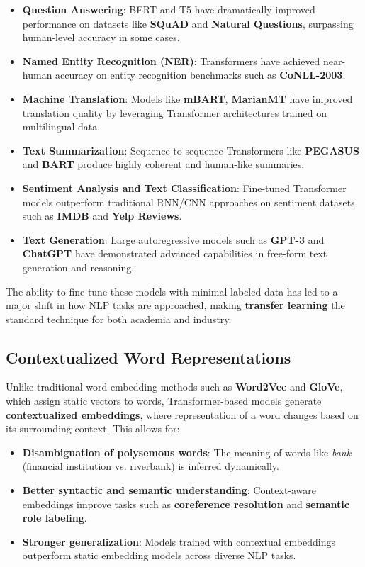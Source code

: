 \begin{itemize}
    \item \textbf{Question Answering}: BERT and T5 have dramatically improved performance on datasets like \textbf{SQuAD} and \textbf{Natural Questions}, surpassing human-level accuracy in some cases.
    \item \textbf{Named Entity Recognition (NER)}: Transformers have achieved near-human accuracy on entity recognition benchmarks such as \textbf{CoNLL-2003}.
    \item \textbf{Machine Translation}: Models like \textbf{mBART}, \textbf{MarianMT} have improved translation quality by leveraging Transformer architectures trained on multilingual data.
    \item \textbf{Text Summarization}: Sequence-to-sequence Transformers like \textbf{PEGASUS} and \textbf{BART} produce highly coherent and human-like summaries.
    \item \textbf{Sentiment Analysis and Text Classification}: Fine-tuned Transformer models outperform traditional RNN/CNN approaches on sentiment datasets such as \textbf{IMDB} and \textbf{Yelp Reviews}.
    \item \textbf{Text Generation}: Large autoregressive models such as \textbf{GPT-3} and \textbf{ChatGPT} have demonstrated advanced capabilities in free-form text generation and reasoning.
\end{itemize}

The ability to fine-tune these models with minimal labeled data has led to a major shift in how NLP tasks are approached, making \textbf{transfer learning} the standard technique for both academia and industry.

\subsection{Contextualized Word Representations}

Unlike traditional word embedding methods such as \textbf{Word2Vec} and \textbf{GloVe}, which assign static vectors to words, Transformer-based models generate \textbf{contextualized embeddings}, where representation of a word changes based on its surrounding context. This allows for:
\begin{itemize}
    \item \textbf{Disambiguation of polysemous words}: The meaning of words like \textit{bank} (financial institution vs. riverbank) is inferred dynamically.
    \item \textbf{Better syntactic and semantic understanding}: Context-aware embeddings improve tasks such as \textbf{coreference resolution} and \textbf{semantic role labeling}.
    \item \textbf{Stronger generalization}: Models trained with contextual embeddings outperform static embedding models across diverse NLP tasks.
\end{itemize}

